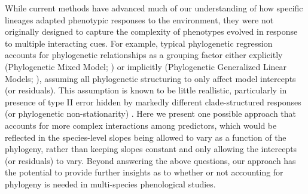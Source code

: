 \documentclass{article}\usepackage[]{graphicx}\usepackage[]{color}
\begin{document}
While current methods have advanced much of our understanding of how specific lineages adapted phenotypic responses to the environment, they were not originally designed to capture the complexity of phenotypes evolved in response to multiple interacting cues. For example, typical phylogenetic regression accounts for phylogenetic relationships as a grouping factor either explicitly (Phylogenetic Mixed Model; \cite{housworth2004phylogenetic}) or implicitly (Phylogenetic Generalized Linear Models; \cite{revell2010phylogenetic}), assuming all phylogenetic structuring to only affect model intercepts (or residuals). This assumption is known to be little reallistic, particularly in presence of type II error hidden by markedly different clade-structured responses (or phylogenetic non-stationarity) \citep{davies2019phylogenetically}. Here we present one possible approach that accounts for more complex interactions among predictors, which would be reflected in the species-level slopes being allowed to vary as a function of the phylogeny, rather than keeping slopes constant and only allowing the intercepts (or residuals) to vary. Beyond answering the above questions, our approach has the potential to provide further insights as to whether or not accounting for phylogeny is needed in multi-species phenological studies.
\end{document}
